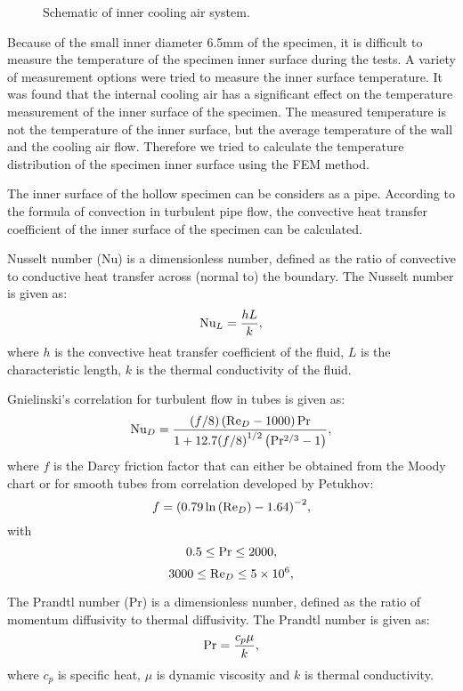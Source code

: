 \begin{figure}[!htp]
\centering{}
\caption{Schematic of inner cooling air system.}
\label{Fig:}
\end{figure}

Because of the small inner diameter 6.5mm of the specimen, it is difficult to measure the temperature of the specimen inner surface during the tests.
A variety of measurement options were tried to measure the inner surface temperature.
It was found that the internal cooling air has a significant effect on the temperature measurement of the inner surface of the specimen.
The measured temperature is not the temperature of the inner surface, but the average temperature of the wall and the cooling air flow.
Therefore we tried to calculate the temperature distribution of the specimen inner surface using the FEM method.


The inner surface of the hollow specimen can be considers as a pipe.
According to the formula of convection in turbulent pipe flow, the convective heat transfer coefficient of the inner surface of the specimen can be calculated.

Nusselt number (Nu) is a dimensionless number, defined as the ratio of convective to conductive heat transfer across (normal to) the boundary.
The Nusselt number is given as:
\[{\rm{N}}{{\rm{u}}_L} = \frac{{hL}}{k},\]
where $h$ is the convective heat transfer coefficient of the fluid, $L$ is the characteristic length, $k$ is the thermal conductivity of the fluid.

Gnielinski's correlation for turbulent flow in tubes is given as:
\[{\rm{N}}{{\rm{u}}_D} = \frac{{\left( {f/8} \right)\left( {{\rm{R}}{{\rm{e}}_D} - 1000} \right){\rm{Pr}}}}{{1 + 12.7{{(f/8)}^{1/2}}\left( {{\rm{P}}{{\rm{r}}^{2/3}} - 1} \right)}},\]
where $f$ is the Darcy friction factor that can either be obtained from the Moody chart or for smooth tubes from correlation developed by Petukhov:
\[f = {\left( {0.79\ln \left( {{\rm{R}}{{\rm{e}}_D}} \right) - 1.64} \right)^{ - 2}},\]
with
\[0.5 \le {\rm{Pr}} \le 2000,\]
\[3000 \le {\rm{R}}{{\rm{e}}_D} \le 5 \times {10^6},\]

The Prandtl number (Pr) is a dimensionless number, defined as the ratio of momentum diffusivity to thermal diffusivity.
The Prandtl number is given as:
\[{\rm{Pr}} = \frac{{{c_p}\mu }}{k},\]
where
$c_{p}$ is specific heat, $\mu$ is dynamic viscosity and $k$ is thermal conductivity.

